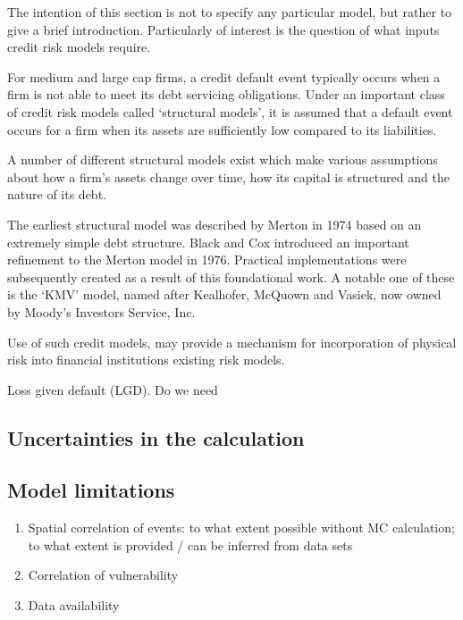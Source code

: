 \documentclass{article}
\begin{document}
The intention of this section is not to specify any particular model, but rather to give a brief introduction. Particularly of interest is the question of what inputs credit risk models require.

For medium and large cap firms, a credit default event typically occurs when a firm is not able to meet its debt servicing obligations. Under an important class of credit risk models called `structural models', it is assumed that a default event occurs for a firm when its assets are sufficiently low compared to its liabilities.

A number of different structural models exist which make various assumptions about how a firm's assets change over time, how its capital is structured and the nature of its debt.

The earliest structural model was described by Merton in 1974 \cite{Merton:1974} based on an extremely simple debt structure. Black and Cox \cite{BlackCox:1976} introduced an important refinement to the Merton model in 1976. Practical implementations were subsequently created as a result of this foundational work. A notable one of these is the `KMV' model, named after Kealhofer, McQuown and Vasiek, now owned by Moody's Investors Service, Inc.

Use of such credit models, may provide a mechanism for incorporation of physical risk into financial institutions existing risk models\cite{KenyonEtAl:2021}.


Loss given default (LGD). Do we need 


\subsection{Uncertainties in the calculation}

\subsection{Model limitations}

\begin{enumerate}
    \item Spatial correlation of events: to what extent possible without MC calculation; to what extent is provided / can be inferred from data sets
    \item Correlation of vulnerability
    \item Data availability
\end{enumerate}
\end{document}
